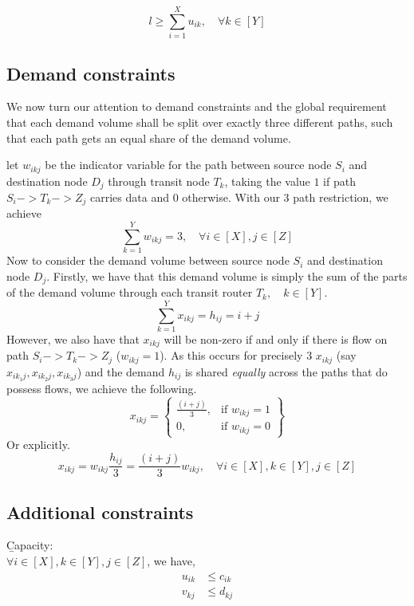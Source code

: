 \documentclass[12pt,twoside]{article}
\begin{document}
\begin{equation}
	l \geq \sum_{i=1}^{X}u_{ik},   \quad  \forall k \in [Y]
\end{equation}



\subsection{Demand constraints}
We now turn our attention to demand constraints and the global requirement that each demand volume shall be split over exactly three different paths, such that each path gets an equal
share of the demand volume.

let $w_{ikj}$ be the indicator variable for the path between source node $S_i$ and destination node $D_j$ through transit node $T_k$, taking the value $1$ if path $S_i->T_k->Z_j$ carries data and $0$ otherwise. With our 3 path restriction, we achieve
\begin{equation}
	\sum_{k=1}^{Y}w_{ikj} = 3,   \quad  \forall i \in [X],j \in [Z]
\end{equation}
Now to consider the demand volume between source node $S_i$ and destination node $D_j$. Firstly, we have that this demand volume is simply the sum of the parts of the demand volume through each transit router $T_k,\quad k \in [Y]$.
\begin{equation*}
	\sum_{k=1}^{Y}x_{ikj} = h_{ij}=i+j
\end{equation*}
However, we also have that $x_{ikj}$ will be non-zero if and only if there is flow on path $S_i->T_k->Z_j$ ($w_{ikj} = 1$). As this occurs for precisely 3 $x_{ikj}$ (say $x_{ik_1j}, x_{ik_2j}, x_{ik_3j}$) and the demand $h_{ij}$ is shared \emph{equally} across the paths that do possess flows, we achieve the following.
\[
x_{ikj}  = \left\{\begin{array}{lr}
\frac{(i + j)}{3}, & \text{if } w_{ikj} = 1\\
0, & \text{if } w_{ikj} = 0
\end{array}\right\}
\]
Or explicitly.
\begin{equation}
	x_{ikj} = w_{ikj} \frac{h_{ij}}{3} = \frac{(i + j)}{3}w_{ikj},\quad  \forall i \in [X],k \in [Y],j \in [Z]
\end{equation}



\subsection{Additional constraints}\label{Sec: Const} 
\b{Capacity}:\\
$\forall i \in [X], k \in [Y], j \in [Z]$, we have,
\begin{align}
	u_{ik} &\leq c_{ik} \\
	v_{kj} &\leq d_{kj}  
\end{align}
\end{document}
